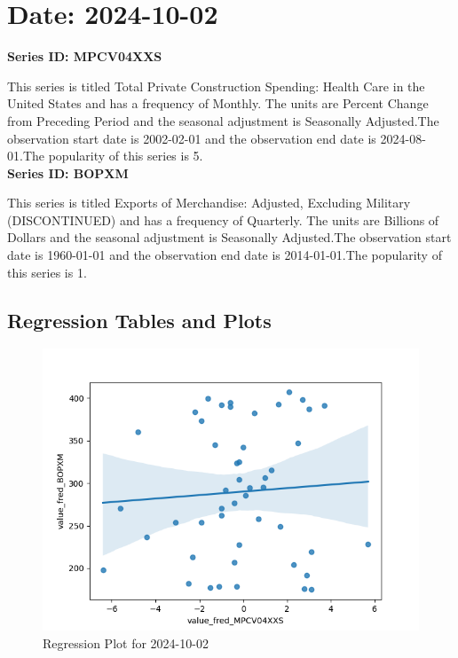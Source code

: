 \section{Date: 2024-10-02}
\noindent \textbf{Series ID: MPCV04XXS} 

\noindent This series is titled Total Private Construction Spending: Health Care in the United States and has a frequency of Monthly. The units are Percent Change from Preceding Period and the seasonal adjustment is Seasonally Adjusted.The observation start date is 2002-02-01 and the observation end date is 2024-08-01.The popularity of this series is 5. \\ 

\noindent \textbf{Series ID: BOPXM} 

\noindent This series is titled Exports of Merchandise: Adjusted, Excluding Military (DISCONTINUED) and has a frequency of Quarterly. The units are Billions of Dollars and the seasonal adjustment is Seasonally Adjusted.The observation start date is 1960-01-01 and the observation end date is 2014-01-01.The popularity of this series is 1. \\ 

\subsection{Regression Tables and Plots}


\begin{figure}
\centering
\includegraphics[scale = 0.9]{plots/plot_2024-10-02.png}
\caption{Regression Plot for 2024-10-02}
\end{figure}
\newpage

